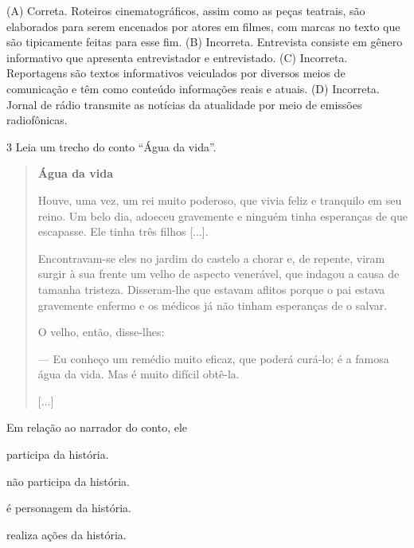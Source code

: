 
(A) Correta. Roteiros cinematográficos, assim como as peças teatrais,
são elaborados para serem encenados por atores em filmes, com marcas
no texto que são tipicamente feitas para esse fim.
(B) Incorreta. Entrevista consiste em gênero informativo que apresenta
entrevistador e entrevistado.
(C) Incorreta. Reportagens são textos informativos veiculados por
diversos meios de comunicação e têm como conteúdo informações reais e
atuais.
(D) Incorreta. Jornal de rádio transmite as notícias da atualidade por
meio de emissões radiofônicas.

\num{3} Leia um trecho do conto ``Água da vida''.

\begin{quote}
\textbf{Água da vida}

Houve, uma vez, um rei muito poderoso, que vivia feliz e tranquilo em
seu reino. Um belo dia, adoeceu gravemente e ninguém tinha esperanças de
que escapasse. Ele tinha três filhos {[}...{]}.

Encontravam-se eles no jardim do castelo a chorar e, de repente, viram
surgir à sua frente um velho de aspecto venerável, que indagou a causa
de tamanha tristeza. Disseram-lhe que estavam aflitos porque o pai
estava gravemente enfermo e os médicos já não tinham esperanças de o
salvar.

O velho, então, disse-lhes:

--- Eu conheço um remédio muito eficaz, que poderá curá-lo; é a famosa
água da vida. Mas é muito difícil obtê-la.

{[}...{]}

\end{quote}

Em relação ao narrador do conto, ele

\begin{escolha}
\item participa da história.

\item não participa da história.

\item é personagem da história.

\item realiza ações da história.
\end{escolha}

